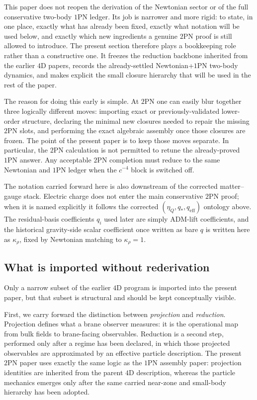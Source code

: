 \documentclass[11pt]{article}
\newcommand{\etaQ}{\eta_Q}
\newcommand{\qstar}{q_*}
\newcommand{\qeff}{q_{\mathrm{eff}}}
\newcommand{\OnePN}{\mathrm{1PN}}
\newcommand{\TwoPN}{\mathrm{2PN}}
\newcommand{\ADM}{\mathrm{ADM}}
\newcommand{\krho}{\kappa_{\rho}}
\begin{document}
This paper does not reopen the derivation of the Newtonian sector or of the full
conservative two-body \(\OnePN\) ledger. Its job is narrower and more rigid: to state,
in one place, exactly what has already been fixed, exactly what notation will be used
below, and exactly which new ingredients a genuine \(\TwoPN\) proof is still allowed to
introduce. The present section therefore plays a bookkeeping role rather than a
constructive one. It freezes the reduction backbone inherited from the earlier \(4\)D
papers, records the already-settled Newtonian+\(\OnePN\) two-body dynamics, and makes
explicit the small closure hierarchy that will be used in the rest of the paper.

The reason for doing this early is simple. At \(2\)PN one can easily blur together
three logically different moves: importing exact or previously-validated lower-order
structure, declaring the minimal new closures needed to repair the missing \(2\)PN
slots, and performing the exact algebraic assembly once those closures are frozen.
The point of the present paper is to keep those moves separate. In particular, the
\(\TwoPN\) calculation is not permitted to retune the already-proved \(\OnePN\) answer.
Any acceptable \(\TwoPN\) completion must reduce to the same Newtonian and \(\OnePN\)
ledger when the \(c^{-4}\) block is switched off.

The notation carried forward here is also downstream of the corrected
matter--gauge stack. Electric charge does not enter the main conservative
\(\TwoPN\) proof; when it is named explicitly it follows the corrected
\((\etaQ,\qstar,\qeff)\) ontology above. The residual-basis coefficients
\(q_i\) used later are simply \(\ADM\)-lift coefficients, and the historical
gravity-side scalar coefficient once written as bare \(q\) is written here as
\(\krho\), fixed by Newtonian matching to \(\krho=1\).

\subsection{What is imported without rederivation}
\label{sec:carry-forward-import}

Only a narrow subset of the earlier \(4\)D program is imported into the present paper,
but that subset is structural and should be kept conceptually visible.

First, we carry forward the distinction between \emph{projection} and \emph{reduction}.
Projection defines what a brane observer measures: it is the operational map from bulk
fields to brane-facing observables. Reduction is a second step, performed only after a
regime has been declared, in which those projected observables are approximated by an
effective particle description. The present \(\TwoPN\) paper uses exactly the same logic
as the \(\OnePN\) assembly paper: projection identities are inherited from the parent
\(4\)D description, whereas the particle mechanics emerges only after the same carried
near-zone and small-body hierarchy has been adopted.
\end{document}
